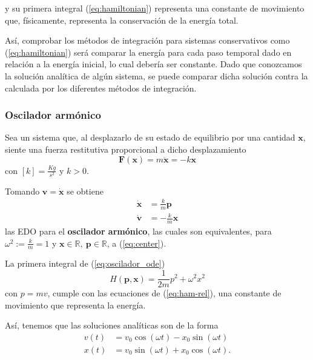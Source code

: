 y su primera integral (\ref{eq:hamiltonian}) representa una constante de movimiento que, físicamente, representa la conservación de la energía total.

Así, comprobar los métodos de integración para sistemas conservativos como (\ref{eq:hamiltonian}) será comparar la energía para cada paso temporal dado en relación a la energía inicial, lo cual debería ser constante. 
Dado que conozcamos la solución analítica de algún sistema, se puede comparar dicha solución contra la calculada por los diferentes métodos de integración.

\subsubsection{Oscilador armónico}
\label{sec:oscilador}
Sea un sistema que, al desplazarlo de su estado de equilibrio por una cantidad $\mathbf{x}$, siente una fuerza restitutiva proporcional a dicho desplazamiento
\begin{equation}
 \mathbf{F}(\mathbf{x}) = m \ddot{\mathbf{x}} = - k\mathbf{x}
 \label{eq:oscilador_force}
\end{equation}
con $[k] = \frac{Kg}{s^2}$  y $k>0$. 

Tomando $\mathbf{v} = \dot{\mathbf{x}}$ se obtiene
\begin{align}
 \dot{\mathbf{x}} &= \frac{k}{m} \mathbf{p} \nonumber \\
 \dot{\mathbf{v}} &= - \frac{k}{m} \mathbf{x}
 \label{eq:oscilador_ode}
\end{align}
las EDO para el \textbf{oscilador armónico}, las cuales son equivalentes, para $\omega^2 := \frac{k}{m} = 1$ y $\mathbf{x} \in \mathbb{R},\ \mathbf{p} \in \mathbb{R}$, a (\ref{eq:center}). 

La primera integral de (\ref{eq:oscilador_ode})
\begin{equation}
 H(\mathbf{p},\mathbf{x}) = \frac{1}{2m}p^2 + \omega^2 x^2
 \label{eq:oscilador_ham}
\end{equation}
con $p=mv$, cumple con las ecuaciones de (\ref{eq:ham-rel}), una constante de movimiento que representa la energía.

Así, tenemos que las soluciones analíticas son de la forma 
\begin{align}
 v(t) &= v_{0}\cos{(\omega t)} - x_{0}\sin{(\omega t)} \nonumber \\
 x(t) &= v_{0}\sin{(\omega t)} + x_{0}\cos{(\omega t)}.
 \label{eq:oscilador_analytical}
\end{align}


